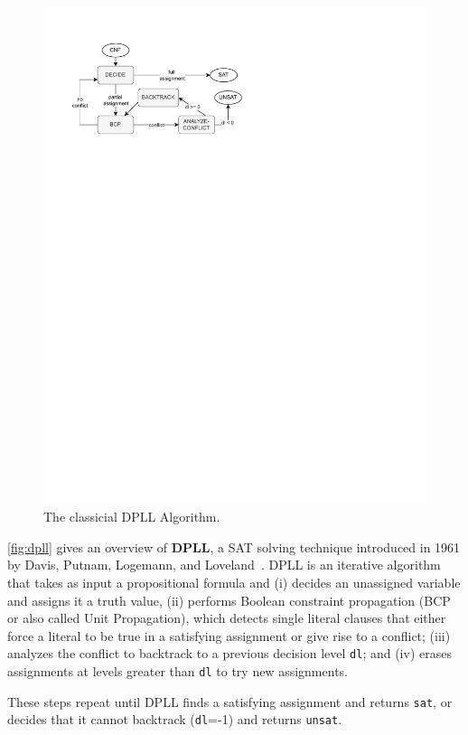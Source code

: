\documentclass[oneside,11pt,dvipsnames]{book}
\numberwithin{equation}{section}
\theoremstyle{definition}
\theoremstyle{remark}
\begin{document}
\begin{figure}
    \centering
  \includegraphics[width=0.8\linewidth]{figure/dpll.pdf}
  \caption{\label{fig:dpll} The classicial DPLL Algorithm.}
\end{figure}


\autoref{fig:dpll} gives an overview of \textbf{DPLL}, a SAT solving technique introduced in 1961 by Davis, Putnam, Logemann, and Loveland~\cite{davis1962machine}. DPLL is an iterative algorithm that takes as input a propositional formula and (i) decides an unassigned variable and assigns it a truth value, (ii) performs Boolean constraint propagation (BCP or also called Unit Propagation),  which detects single literal clauses that either force a literal to be true in a satisfying assignment or give rise to a conflict; (iii) analyzes the conflict to backtrack to a previous decision level \texttt{dl}; and (iv) erases assignments at levels greater than \texttt{dl} to try new  assignments. 

These steps repeat until DPLL finds  a satisfying assignment and returns \texttt{sat}, or decides that it cannot backtrack (\texttt{dl}=-1) and returns \texttt{unsat}.


\end{document}
